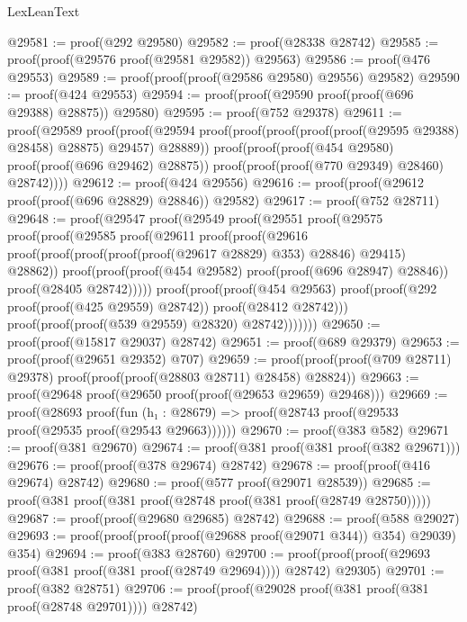 \begin{lexlean}{LexLeanText}
\begin{coremodule}
@29581 := proof(@292 @29580)
@29582 := proof(@28338 @28742)
@29585 := proof(proof(@29576 proof(@29581 @29582)) @29563)
@29586 := proof(@476 @29553)
@29589 := proof(proof(proof(@29586 @29580) @29556) @29582)
@29590 := proof(@424 @29553)
@29594 := proof(proof(@29590 proof(proof(@696 @29388) @28875)) @29580)
@29595 := proof(@752 @29378)
@29611 := proof(@29589
      proof(proof(@29594
            proof(proof(proof(proof(proof(@29595 @29388) @28458) @28875) @29457) @28889))
          proof(proof(proof(@454 @29580) proof(proof(@696 @29462) @28875))
              proof(proof(proof(@770 @29349) @28460) @28742))))
@29612 := proof(@424 @29556)
@29616 := proof(proof(@29612 proof(proof(@696 @28829) @28846)) @29582)
@29617 := proof(@752 @28711)
@29648 := proof(@29547
      proof(@29549
          proof(@29551
              proof(@29575
                  proof(proof(@29585
                        proof(@29611
                            proof(proof(@29616
                                  proof(proof(proof(proof(proof(@29617 @28829) @353) @28846) @29415)
                                      @28862))
                                proof(proof(proof(@454 @29582) proof(proof(@696 @28947) @28846))
                                    proof(@28405 @28742)))))
                      proof(proof(proof(@454 @29563)
                            proof(proof(@292 proof(proof(@425 @29559) @28742))
                                proof(@28412 @28742)))
                          proof(proof(proof(@539 @29559) @28320) @28742)))))))
@29650 := proof(proof(@15817 @29037) @28742)
@29651 := proof(@689 @29379)
@29653 := proof(proof(@29651 @29352) @707)
@29659 := proof(proof(proof(@709 @28711) @29378) proof(proof(proof(@28803 @28711) @28458) @28824))
@29663 := proof(@29648 proof(@29650 proof(proof(@29653 @29659) @29468)))
@29669 := proof(@28693
      proof(fun (h₁ : @28679) => proof(@28743 proof(@29533 proof(@29535 proof(@29543 @29663))))))
@29670 := proof(@383 @582)
@29671 := proof(@381 @29670)
@29674 := proof(@381 proof(@381 proof(@382 @29671)))
@29676 := proof(proof(@378 @29674) @28742)
@29678 := proof(proof(@416 @29674) @28742)
@29680 := proof(@577 proof(@29071 @28539))
@29685 := proof(@381 proof(@381 proof(@28748 proof(@381 proof(@28749 @28750)))))
@29687 := proof(proof(@29680 @29685) @28742)
@29688 := proof(@588 @29027)
@29693 := proof(proof(proof(proof(@29688 proof(@29071 @344)) @354) @29039) @354)
@29694 := proof(@383 @28760)
@29700 := proof(proof(proof(@29693 proof(@381 proof(@381 proof(@28749 @29694)))) @28742) @29305)
@29701 := proof(@382 @28751)
@29706 := proof(proof(@29028 proof(@381 proof(@381 proof(@28748 @29701)))) @28742)

\end{coremodule}
\end{lexlean}
